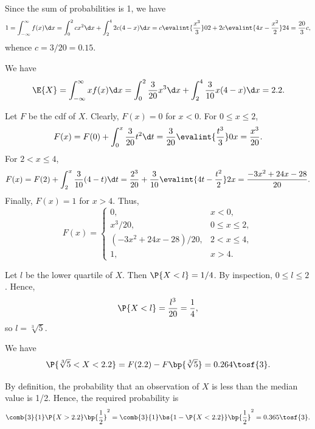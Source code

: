 \begin{solution}
    \begin{ppart}
        Since the sum of probabilities is 1, we have \[1 = \int_{-\infty}^\infty f(x) \d x = \int_0^2 cx^2 \d x + \int_2^4 2c(4-x) \d x = c\evalint{\frac{x^3}{3}}02 + 2c \evalint{4x - \frac{x^2}{2}}24 = \frac{20}3 c,\] whence $c = 3/20 = 0.15$.
    \end{ppart}
    \begin{ppart}
        We have \[\E{X} = \int_{-\infty}^\infty x f(x) \d x = \int_0^2 \frac3{20} x^3 \d x + \int_2^4 \frac{3}{10} x(4-x) \d x = 2.2.\]
    \end{ppart}
    \begin{ppart}
        Let $F$ be the cdf of $X$. Clearly, $F(x) = 0$ for $x < 0$. For $0 \leq x \leq 2$, \[F(x) = F(0) + \int_0^x \frac3{20} t^2 \d t = \frac3{20} \evalint{\frac{t^3}{3}}0x = \frac{x^3}{20}.\] For $2 < x \leq 4$, \[F(x) = F(2) + \int_2^x \frac3{10} (4-t) \d t = \frac{2^3}{20} + \frac3{10} \evalint{4t - \frac{t^2}2}2x = \frac{-3x^2 + 24x - 28}{20}.\] Finally, $F(x) = 1$ for $x > 4$. Thus, \[F(x) = \begin{cases}
            0, & x < 0,\\
            x^3/20, & 0 \leq x \leq 2,\\
            (-3x^2 + 24x - 28)/20, & 2 < x \leq 4,\\
            1, & x > 4.
        \end{cases}\]

        Let $l$ be the lower quartile of $X$. Then $\P{X < l} = 1/4$. By inspection, $0 \leq l \leq 2$. Hence, \[\P{X < l} = \frac{l^3}{20} = \frac14,\] so $l = \sqrt[3]{5}$.
    \end{ppart}
    \begin{ppart}
        We have \[\P{\sqrt[3]{5} < X < 2.2} = F(2.2) - F\bp{\sqrt[3]{5}} = 0.264 \tosf{3}.\]
    \end{ppart}
    \begin{ppart}
        By definition, the probability that an observation of $X$ is less than the median value is 1/2. Hence, the required probability is \[\comb{3}{1} \P{X > 2.2} \bp{\frac12}^2 = \comb{3}{1} \bs{1 - \P{X < 2.2}} \bp{\frac12}^2 = 0.365 \tosf{3}.\]
    \end{ppart}
\end{solution}

